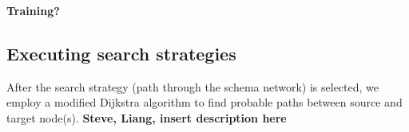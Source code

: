 \documentclass[11pt,notitlepage]{article}
\begin{document}
\textbf{Training?}



\subsection{Executing search strategies}
\label{section:Dijkstra}
After the search strategy (path through the schema network) is selected, we employ a modified Dijkstra algorithm to find probable paths between source and target node(s).
\textbf{Steve, Liang, insert description here}

\end{document}

